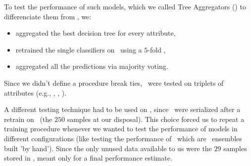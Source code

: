 To test the performance of such models, which we called Tree Aggregators (\tas) to differenciate them from
\rfs, we:
\begin{itemize}
	\item aggregated the best decision tree for every attribute,
	\item retrained the single classifiers on \dr\ using a $5$-fold \cv,
	\item aggregated all the predictions via majority voting.
\end{itemize}
Since we didn't define a procedure break ties, \tas\ were tested on triplets of attributes (e.g., \an, \bn, \cnmod).

A different testing technique had to be used on \tas, since \dts\ were serialized after a retrain on
\dr\ (the $250$ samples at our disposal). This choice forced us to repeat a training procedure
whenever we wanted to test the performance of models in different configurations (like testing the
performance of \tas\ which are \dt\ ensembles built 'by hand'). Since the only unused data available
to us were the $29$ samples stored in \db, meant only for a final performance estimate.

